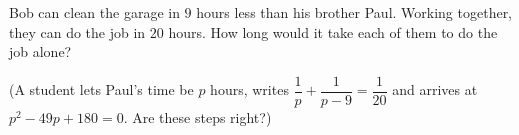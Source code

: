 Bob can clean the garage in $9$ hours less than his brother Paul. Working together, they can do the job in $20$ hours. How long would it take each of them to do the job alone?

(A student lets Paul's time be $p$ hours, writes $\dfrac{1}{p}+\dfrac{1}{p-9}=\dfrac{1}{20}$ and arrives at $p^2-49p+180=0$. Are these steps right?)
